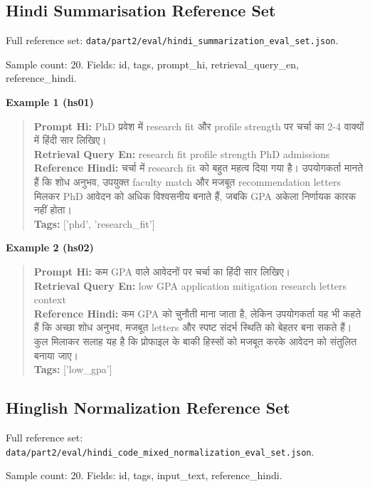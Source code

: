 \documentclass[11pt]{article}
\begin{document}
        \subsection*{Hindi Summarisation Reference Set}

Full reference set: \texttt{data/part2/eval/hindi\_summarization\_eval\_set.json}.

Sample count: 20. Fields: id, tags, prompt\_hi, retrieval\_query\_en, reference\_hindi.

\textbf{Example 1 (hs01)}
\begin{quote}\small
\textbf{Prompt Hi:} {\hindifont PhD प्रवेश में research fit और profile strength पर चर्चा का 2-4 वाक्यों में हिंदी सार लिखिए।}\\
\textbf{Retrieval Query En:} research fit profile strength PhD admissions\\
\textbf{Reference Hindi:} {\hindifont चर्चा में research fit को बहुत महत्व दिया गया है। उपयोगकर्ता मानते हैं कि शोध अनुभव, उपयुक्त faculty match और मजबूत recommendation letters मिलकर PhD आवेदन को अधिक विश्वसनीय बनाते हैं, जबकि GPA अकेला निर्णायक कारक नहीं होता।}\\
\textbf{Tags:} ['phd', 'research\_fit']\\
\end{quote}

\textbf{Example 2 (hs02)}
\begin{quote}\small
\textbf{Prompt Hi:} {\hindifont कम GPA वाले आवेदनों पर चर्चा का हिंदी सार लिखिए।}\\
\textbf{Retrieval Query En:} low GPA application mitigation research letters context\\
\textbf{Reference Hindi:} {\hindifont कम GPA को चुनौती माना जाता है, लेकिन उपयोगकर्ता यह भी कहते हैं कि अच्छा शोध अनुभव, मजबूत letters और स्पष्ट संदर्भ स्थिति को बेहतर बना सकते हैं। कुल मिलाकर सलाह यह है कि प्रोफाइल के बाकी हिस्सों को मजबूत करके आवेदन को संतुलित बनाया जाए।}\\
\textbf{Tags:} ['low\_gpa']\\
\end{quote}

        \subsection*{Hinglish Normalization Reference Set}

Full reference set: \texttt{data/part2/eval/hindi\_code\_mixed\_normalization\_eval\_set.json}.

Sample count: 20. Fields: id, tags, input\_text, reference\_hindi.
\end{document}
